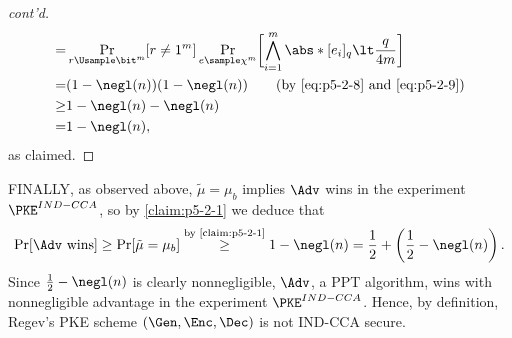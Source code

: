 \begin{answer}[ii]
\begin{proof}[cont'd]
\begin{align*}
            =& \Pr_{r\Usample\bit^m}[r\neq 1^m]\Pr_{e\sample\chi^m}\biggl[ \bigwedge_{i=1}^m \abs*{[e_i]_q} \lt \frac{q}{4m}\biggr]\\
            =& (1-\negl(n))(1-\negl(n)) 
            \qquad (\textrm{by \eqref{eq:p5-2-8} and \eqref{eq:p5-2-9}})\\
            \ge& 1-\negl(n)-\negl(n)\\
            =& 1- \negl(n),
        \end{align*}
        as claimed.
    \end{proof}

    FINALLY, as observed above, $\tilde{\mu}=\mu_b$ implies $\Adv$ wins in the experiment $\PKE^{IND-CCA}$, so by \autoref{claim:p5-2-1} we deduce that
    \[
        \Pr[\Adv \textrm{ wins}] \ge \Pr[\tilde{\mu}=\mu_b] \stackrel{\textrm{by \autoref{claim:p5-2-1}}}\ge 1-\negl(n) = \frac{1}{2}+\left(\frac{1}{2}-\negl(n)\right).
    \]
    Since $\frac{1}{2}-\negl(n)$ is clearly nonnegligible, $\Adv$, a PPT algorithm, wins with nonnegligible advantage in the experiment $\PKE^{IND-CCA}$. Hence, by definition, Regev's PKE scheme $(\Gen, \Enc, \Dec)$ is not IND-CCA secure. 
\end{answer}